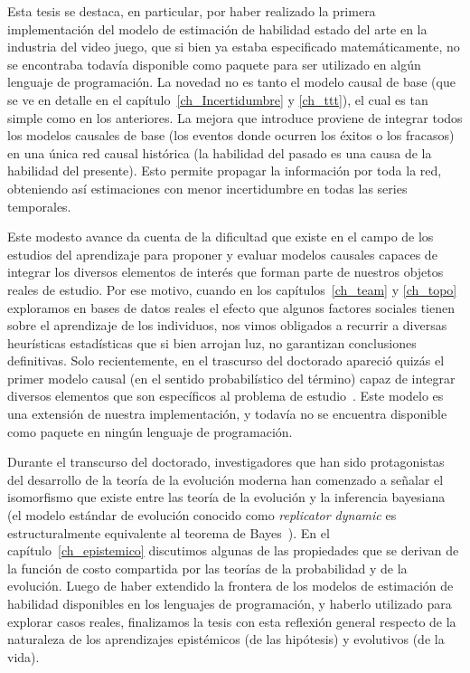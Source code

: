 \documentclass[a4paper,11pt]{book}
\theoremstyle{definition}
\begin{document}

Esta tesis se destaca, en particular, por haber realizado la primera implementaci\'on del modelo de estimaci\'on de habilidad estado del arte en la industria del video juego, que si bien ya estaba especificado matem\'aticamente, no se encontraba todav\'ia disponible como paquete para ser utilizado en alg\'un lenguaje de programaci\'on.
%
La novedad no es tanto el modelo causal de base (que se ve en detalle en el cap\'itulo~\ref{ch_Incertidumbre} y \ref{ch_ttt}), el cual es tan simple como en los anteriores.
%
La mejora que introduce proviene de integrar todos los modelos causales de base (los eventos donde ocurren los \'exitos o los fracasos) en una \'unica red causal hist\'orica (la habilidad del pasado es una causa de la habilidad del presente).
%
Esto permite propagar la informaci\'on por toda la red, obteniendo as\'i estimaciones con menor incertidumbre en todas las series temporales.


Este modesto avance da cuenta de la dificultad que existe en el campo de los estudios del aprendizaje para proponer y evaluar modelos causales capaces de integrar los diversos elementos de inter\'es que forman parte de nuestros objetos reales de estudio.
%
Por ese motivo, cuando en los cap\'itulos~\ref{ch_team} y \ref{ch_topo} exploramos en bases de datos reales el efecto que algunos factores sociales tienen sobre el aprendizaje de los individuos, nos vimos obligados a recurrir a diversas heur\'isticas estad\'isticas que si bien arrojan luz, no garantizan conclusiones definitivas.
%
Solo recientemente, en el trascurso del doctorado apareci\'o quiz\'as el primer modelo causal (en el sentido probabil\'istico del t\'ermino) capaz de integrar diversos elementos que son espec\'ificos al problema de estudio~\cite{minka2018-trueskill2}.
%
Este modelo es una extensi\'on de nuestra implementaci\'on, y todav\'ia no se encuentra disponible como paquete en ning\'un lenguaje de programaci\'on.


Durante el transcurso del doctorado, investigadores que han sido protagonistas del desarrollo de la teor\'ia de la evoluci\'on moderna han comenzado a se\~nalar el isomorfismo que existe entre las teor\'ia de la evoluci\'on y la inferencia bayesiana~\cite{czegel2019-bayesianEvolution, czegel2022-bayesDarwin} (el modelo est\'andar de evoluci\'on conocido como \emph{replicator dynamic} \cite{taylor1978-replicatorDynamic} es estructuralmente equivalente al teorema de Bayes~\cite{harper2009-replicatorAsInference,shalizi2009-replicatorAsInference}).
%
En el cap\'itulo~\ref{ch_epistemico} discutimos algunas de las propiedades que se derivan de la funci\'on de costo compartida por las teor\'ias de la probabilidad y de la evoluci\'on.
%
Luego de haber extendido la frontera de los modelos de estimaci\'on de habilidad disponibles en los lenguajes de programaci\'on, y haberlo utilizado para explorar casos reales, finalizamos la tesis con esta reflexi\'on general respecto de la naturaleza de los aprendizajes epist\'emicos (de las hip\'otesis) y evolutivos (de la vida).
\end{document}
